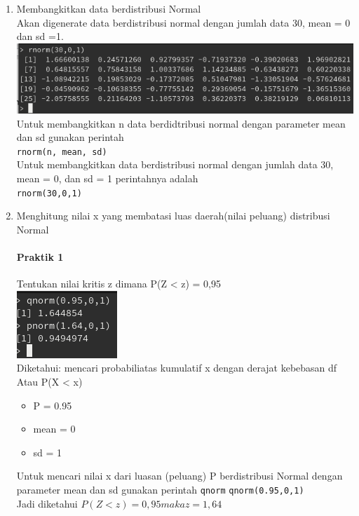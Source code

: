 \documentclass[a4paper,12pt]{article}
\begin{document}
\begin{enumerate}[label=\textbf{\Alph*.}]
\begin{enumerate}
\end{enumerate}

\item Membangkitkan data berdistribusi Normal\\
    Akan digenerate data berdistribusi normal dengan jumlah data 30, mean = 0 dan sd =1.\\
    \includegraphics[scale=.7]{prakb}\\
    Untuk membangkitkan n data berdidtribusi normal dengan parameter mean dan sd gunakan perintah\\
    \texttt{rnorm(n, mean, sd)}\\
    Untuk membangkitkan data berdistribusi normal dengan jumlah data 30, mean = 0, dan sd = 1 perintahnya adalah\\
    \texttt{rnorm(30,0,1)}

\item Menghitung nilai x yang membatasi luas daerah(nilai peluang) distribusi Normal\\
    \paragraph{Praktik 1\\}
    Tentukan nilai kritis z dimana P(Z < z) = 0,95\\
    \includegraphics{prakc1}\\
    Diketahui:     mencari probabiliatas kumulatif x  dengan derajat kebebasan df
 Atau P(X < x)
    \begin{itemize}
        \item P = 0.95
        \item mean = 0  
        \item sd = 1
    \end{itemize}
    Untuk mencari nilai x dari luasan (peluang) P berdistribusi Normal dengan parameter mean dan sd gunakan perintah \texttt{qnorm}
    \texttt{qnorm(0.95,0,1)}\\
        Jadi diketahui $P(Z < z) = 0,95 maka z = 1,64$


\end{enumerate}
\end{document}
